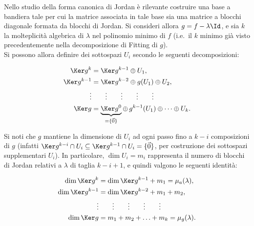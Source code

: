 \documentclass[11pt]{article}
\begin{document}
	\vskip 0.1in

	Nello studio della forma canonica di Jordan è rilevante costruire una base a bandiera tale per cui la matrice
	associata in tale base sia una matrice a blocchi diagonale formata da blocchi di Jordan. Si consideri
	allora $g = f - \lambda \Id$, e sia $k$ la molteplicità algebrica di $\lambda$ nel polinomio minimo
	di $f$ (i.e.~il $k$ minimo già visto precedentemente nella decomposizione di Fitting di $g$). \\
	
	Si possono allora definire dei sottospazi $U_i$ secondo le seguenti decomposizioni:
	
	\begin{align*}
		\Ker g^k &= \Ker g^{k-1} \oplus U_1, \\
		\Ker g^{k-1} &= \Ker g^{k-2} \oplus g(U_1) \oplus U_2, \\
		\vdots & \qquad \vdots \qquad \vdots \qquad \vdots \qquad \vdots \\
		\Ker g &= \underbrace{\Ker g^0}_{= \{ \vec 0\}} \oplus \, g^{k-1}(U_1) \oplus \cdots \oplus U_{k}. 
	\end{align*}

	Si noti che $g$ mantiene la dimensione di $U_i$ ad ogni passo fino a $k-i$ composizioni di $g$ (infatti
	$\Ker g^{k-i} \cap U_i \subseteq \Ker g^{k-1} \cap U_i = \{\vec 0\}$, per costruzione dei sottospazi
	supplementari $U_i$). In particolare, $\dim U_i = m_i$ rappresenta il numero di blocchi di Jordan
	relativi a $\lambda$ di taglia $k-i+1$, e quindi valgono le seguenti identità:
	
	\begin{align*}
		\dim \Ker g^k &= \dim \Ker g^{k-1} + m_1 = \mu_a(\lambda), \\
		\dim \Ker g^{k-1} &= \dim \Ker g^{k-2} + m_1 + m_2, \\
		\vdots & \qquad \vdots \qquad \vdots \qquad \vdots \qquad \vdots \\
		\dim \Ker g &= m_1 + m_2 + \ldots + m_k = \mu_g(\lambda).
	\end{align*}

\end{document}
